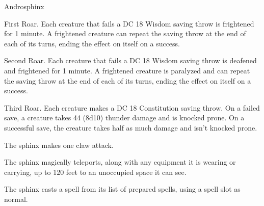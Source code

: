 \begin{monsterbox}{Androsphinx}
\begin{monsteraction}
First Roar. Each creature that fails a DC 18 Wisdom saving throw is frightened for 1 minute. A frightened creature can repeat the saving throw at the end of each of its turns, ending the effect on itself on a success.

Second Roar. Each creature that fails a DC 18 Wisdom saving throw is deafened and frightened for 1 minute. A frightened creature is paralyzed and can repeat the saving throw at the end of each of its turns, ending the effect on itself on a success.

Third Roar. Each creature makes a DC 18 Constitution saving throw. On a failed save, a creature takes 44 (8d10) thunder damage and is knocked prone. On a successful save, the creature takes half as much damage and isn't knocked prone.
\end{monsteraction}
\begin{monsteraction}
The sphinx makes one claw attack.
\end{monsteraction}
\begin{monsteraction}
The sphinx magically teleports, along with any equipment it is wearing or carrying, up to 120 feet to an unoccupied space it can see.
\end{monsteraction}
\begin{monsteraction}
The sphinx casts a spell from its list of prepared spells, using a spell slot as normal.
\end{monsteraction}
\end{monsterbox}